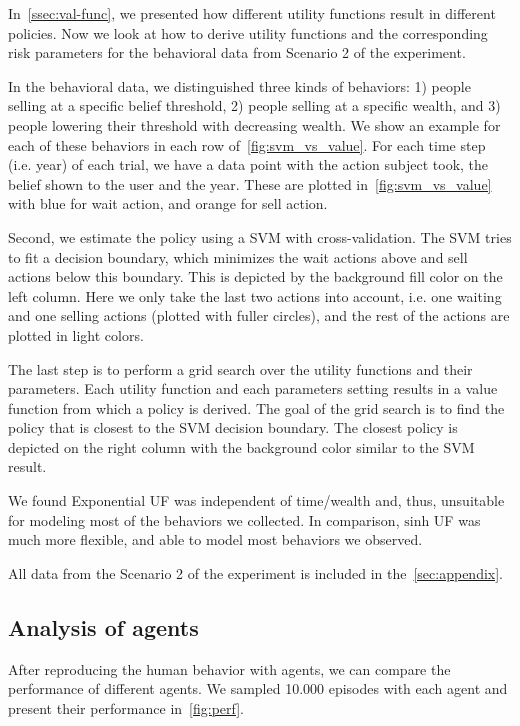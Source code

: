 In~\autoref{ssec:val-func}, we presented how different utility functions result in different policies.
Now we look at how to derive utility functions and the corresponding risk parameters for the behavioral data from Scenario 2 of the experiment.

In the behavioral data, we distinguished three kinds of behaviors: 1) people selling at a specific belief threshold, 2) people selling at a specific wealth, and 3) people lowering their threshold with decreasing wealth.
We show an example for each of these behaviors in each row of~\autoref{fig:svm_vs_value}.
For each time step (i.e. year) of each trial, we have a data point with the action subject took, the belief shown to the user and the year. These are plotted in~\autoref{fig:svm_vs_value} with blue for wait action, and orange for sell action.

Second, we estimate the policy using a SVM \cite{svm} with cross-validation. The SVM tries to fit a decision boundary, which minimizes the wait actions above and sell actions below this boundary.
This is depicted by the background fill color on the left column.
Here we only take the last two actions into account, i.e. one waiting and one selling actions (plotted with fuller circles), and the rest of the actions are plotted in light colors.

The last step is to perform a grid search over the utility functions and their parameters.
Each utility function and each parameters setting results in a value function from which a policy is derived.
The goal of the grid search is to find the policy that is closest to the SVM decision boundary.
The closest policy is depicted on the right column with the background color similar to the SVM result.

We found Exponential UF was independent of time/wealth and, thus, unsuitable for modeling most of the behaviors we collected.
In comparison, $\text{sinh}$ UF was much more flexible, and able to model most behaviors we observed.

All data from the Scenario 2 of the experiment is included in the~\autoref{sec:appendix}.

\subsection{Analysis of agents}
After reproducing the human behavior with agents, we can compare the performance of different agents.
We sampled 10.000 episodes with each agent and present their performance in~\autoref{fig:perf}.

